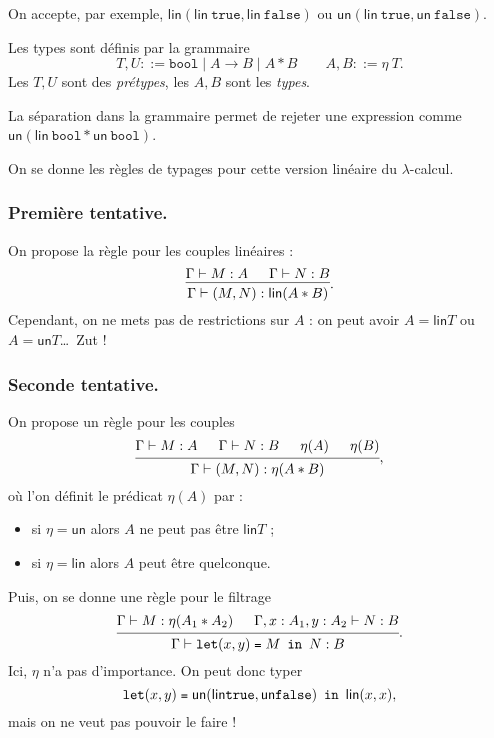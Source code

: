 \documentclass[./main]{subfiles}
\begin{document}
  On accepte, par exemple, $\mathsf{lin}(\mathsf{lin}\: \mathtt{true}, \mathsf{lin}\: \mathtt{false})$ ou $\mathsf{un}(\mathsf{lin}\: \mathtt{true}, \mathsf{un}\: \mathtt{false})$.

  Les types sont définis par la grammaire \[
  T, U ::= \mathtt{bool}  \mid A \to B  \mid A * B\quad\quad A, B ::= \eta \: T
  .\] 
  Les $T, U$ sont des \textit{prétypes}, les $A,B$ sont les \textit{types}.

  La séparation dans la grammaire permet de rejeter une expression comme $\mathsf{un}(\mathsf{lin} \: \mathtt{bool} * \mathsf{un} \: \mathtt{bool})$.

  On se donne les règles de typages pour cette version linéaire du $\lambda$-calcul.

  \subsubsection{Première tentative.}

  On propose la règle pour les couples linéaires :
  \[
  \begin{prooftree}
    \hypo{\Gamma \vdash M : A}
    \hypo{\Gamma \vdash N : B}
    \infer 2{\Gamma \vdash (M, N) : \mathsf{lin}(A * B)}
  \end{prooftree}
  .\]
  Cependant, on ne mets  pas de restrictions sur $A$ : on peut avoir $A = \mathsf{lin} T$ ou $A = \mathsf{un} T$\ldots\ Zut !

  \subsubsection{Seconde tentative.}

  On propose un règle pour les couples 
  \[
  \begin{prooftree}
    \hypo{\Gamma \vdash M : A}
    \hypo{\Gamma \vdash N : B}
    \hypo{\eta(A)}
    \hypo{\eta(B)}
    \infer 4{\Gamma \vdash (M, N) : \eta (A * B)}
  \end{prooftree}
  ,\] 
  où l'on définit le prédicat $\eta(A)$ par :
   \begin{itemize}
    \item si $\eta = \mathsf{un}$ alors $A$ ne peut pas être $\mathsf{lin} T$ ;
    \item si $\eta = \mathsf{lin}$ alors $A$ peut être quelconque.
  \end{itemize}

  Puis, on se donne une règle pour le filtrage \[
    \begin{prooftree}
      \hypo{\Gamma \vdash M : \eta (A_1 * A_2)}
      \hypo{\Gamma, x : A_1, y : A_2 \vdash N : B}
      \infer 2{\Gamma \vdash \letin {(x,y)} M N : B}
    \end{prooftree}
  .\] 
  Ici, $\eta$ n'a pas d'importance.
  On peut donc typer \[
    \letin {(x,y)} {\mathsf{un}(\mathsf{lin} \mathtt{true}, \mathsf{un}\mathtt{false})} \mathsf{lin}(x,x)
  ,\] 
  mais on ne veut pas pouvoir le faire !
\end{document}
